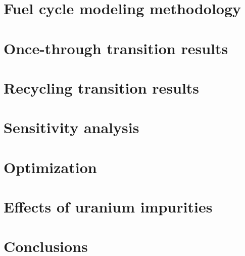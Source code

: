 \documentclass[edeposit,fullpage]{uiucthesis2018}
\begin{document}
\chapter{Fuel cycle modeling methodology} \label{ch:fc_methods}


\chapter{Once-through transition results} \label{ch:once_through_results}


\chapter{Recycling transition results} \label{ch:recycle_results}


\chapter{Sensitivity analysis} \label{ch:sa}


\chapter{Optimization}\label{ch:optimization}


\chapter{Effects of uranium impurities} \label{ch:neutronics}


\chapter{Conclusions} \label{ch:conclusions}




\backmatter




\appendix
  
\end{document}
